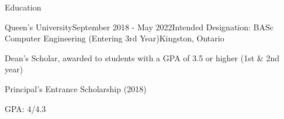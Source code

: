 \documentclass{resume} %
\begin{document}

\begin{rSection}{Education}

\begin{rSubsection}{Queen's University}{September 2018 - May 2022}{Intended
    Designation: BASc Computer Engineering (Entering 3rd Year)}{Kingston, Ontario}
\item Dean's Scholar, awarded to students with a GPA of 3.5 or higher (1st \&
  2nd year)
\item Principal's Entrance Scholarship (2018)
\item GPA: 4/4.3
\end{rSubsection}
\end{rSection}

\end{document}
